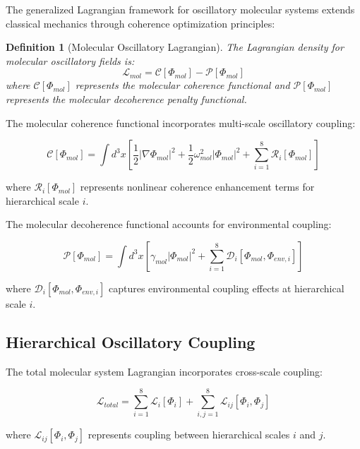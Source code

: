 \documentclass[12pt,a4paper]{article}
\newtheorem{definition}[theorem]{Definition}
\begin{document}
The generalized Lagrangian framework for oscillatory molecular systems extends classical mechanics through coherence optimization principles:

\begin{definition}[Molecular Oscillatory Lagrangian]
The Lagrangian density for molecular oscillatory fields is:
\begin{equation}
\mathcal{L}_{mol} = \mathcal{C}[\Phi_{mol}] - \mathcal{P}[\Phi_{mol}]
\end{equation}
where $\mathcal{C}[\Phi_{mol}]$ represents the molecular coherence functional and $\mathcal{P}[\Phi_{mol}]$ represents the molecular decoherence penalty functional.
\end{definition}

The molecular coherence functional incorporates multi-scale oscillatory coupling:

\begin{equation}
\mathcal{C}[\Phi_{mol}] = \int d^3x \left[\frac{1}{2}|\nabla\Phi_{mol}|^2 + \frac{1}{2}\omega_{mol}^2|\Phi_{mol}|^2 + \sum_{i=1}^{8} \mathcal{R}_i[\Phi_{mol}]\right]
\end{equation}

where $\mathcal{R}_i[\Phi_{mol}]$ represents nonlinear coherence enhancement terms for hierarchical scale $i$.

The molecular decoherence functional accounts for environmental coupling:

\begin{equation}
\mathcal{P}[\Phi_{mol}] = \int d^3x \left[\gamma_{mol}|\Phi_{mol}|^2 + \sum_{i=1}^{8} \mathcal{D}_i[\Phi_{mol}, \Phi_{env,i}]\right]
\end{equation}

where $\mathcal{D}_i[\Phi_{mol}, \Phi_{env,i}]$ captures environmental coupling effects at hierarchical scale $i$.

\subsection{Hierarchical Oscillatory Coupling}

The total molecular system Lagrangian incorporates cross-scale coupling:

\begin{equation}
\mathcal{L}_{total} = \sum_{i=1}^{8} \mathcal{L}_i[\Phi_i] + \sum_{i,j=1}^{8} \mathcal{L}_{ij}[\Phi_i, \Phi_j]
\end{equation}

where $\mathcal{L}_{ij}[\Phi_i, \Phi_j]$ represents coupling between hierarchical scales $i$ and $j$.
\end{document}
